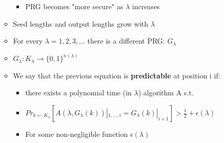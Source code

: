 \documentclass[]{article}
\begin{document}
\begin{itemize}
\begin{itemize}
\begin{itemize}
			\item PRG becomes "more secure" as $\lambda$ increases
		\end{itemize}
		\item Seed lengths and output lengths grow with $\lambda$
		\item For every $\lambda=1,2,3,...$ there is a different PRG: $G_{\lambda}$
		\item $G_{\lambda} : K_{\lambda} \rightarrow \{0,1\}^{n(\lambda)}$
		\item We say that the previous equation is \textbf{predictable} at position i if: 
		\begin{itemize}
			\item there exists a polynomial time (in $\lambda$) algorithm A s.t.
			\item $Pr_{k \leftarrow K_{\lambda}} [ A(\lambda, G_{\lambda}(k)) |_{1,...,i} = G_{\lambda}(k) |_{i+1}] > \frac{1}{2} + \epsilon(\lambda)$
			\item For some non-negligible function $\epsilon(\lambda)$
		\end{itemize}
	\end{itemize}
\end{itemize}
\end{document}
